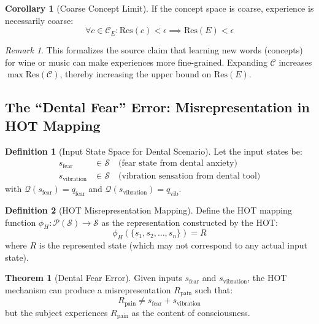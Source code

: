 \documentclass[11pt,a4paper]{article}
\theoremstyle{definition}
\newtheorem{definition}{Definition}[section]
\newtheorem{theorem}{Theorem}[section]
\newtheorem{corollary}{Corollary}[section]
\theoremstyle{remark}
\newtheorem*{remark}{Remark}
\newcommand{\Sset}{\mathcal{S}}
\newcommand{\Q}{\mathcal{Q}}
\newcommand{\Concept}{\mathcal{C}}
\newcommand{\ConceptE}{\mathcal{C}_E}
\newcommand{\Res}{\text{Res}}
\begin{document}
\begin{corollary}[Coarse Concept Limit]
\label{cor:coarse}
If the concept space is coarse, experience is necessarily coarse:
\begin{equation}
\forall c \in \ConceptE : \Res(c) < \epsilon \implies \Res(E) < \epsilon
\end{equation}
\end{corollary}

\begin{remark}
This formalizes the source claim that learning new words (concepts) for wine or music can make experiences more fine-grained. Expanding $\Concept$ increases $\max \Res(\Concept)$, thereby increasing the upper bound on $\Res(E)$.
\end{remark}

\subsection{The ``Dental Fear'' Error: Misrepresentation in HOT Mapping}

\begin{definition}[Input State Space for Dental Scenario]
\label{def:dental-input}
Let the input states be:
\begin{align}
s_{\text{fear}} &\in \Sset \quad \text{(fear state from dental anxiety)} \\
s_{\text{vibration}} &\in \Sset \quad \text{(vibration sensation from dental tool)}
\end{align}
with $\Q(s_{\text{fear}}) = q_{\text{fear}}$ and $\Q(s_{\text{vibration}}) = q_{\text{vib}}$.
\end{definition}

\begin{definition}[HOT Misrepresentation Mapping]
\label{def:misrep}
Define the HOT mapping function $\phi_H: \mathcal{P}(\Sset) \to \Sset$ as the representation constructed by the HOT:
\begin{equation}
\phi_H(\{s_1, s_2, \ldots, s_n\}) = R
\end{equation}
where $R$ is the represented state (which may not correspond to any actual input state).
\end{definition}

\begin{theorem}[Dental Fear Error]
\label{thm:dental}
Given inputs $s_{\text{fear}}$ and $s_{\text{vibration}}$, the HOT mechanism can produce a misrepresentation $R_{\text{pain}}$ such that:
\begin{equation}
\boxed{R_{\text{pain}} \neq s_{\text{fear}} + s_{\text{vibration}}}
\end{equation}
but the subject experiences $R_{\text{pain}}$ as the content of consciousness.
\end{theorem}
\end{document}
